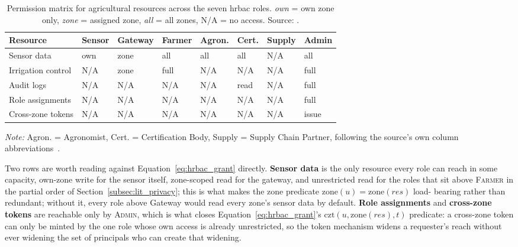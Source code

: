 \documentclass[12pt,a4paper,oneside]{book}
\begin{document}
\begin{table}[htbp]
\centering
\caption{Permission matrix for agricultural resources across the seven
         \gls{hrbac} roles. \emph{own} = own zone only, \emph{zone} =
         assigned zone, \emph{all} = all zones, N/A = no access.
         Source: \cite{beloasone2025hrbac}.}
\label{tab:app-hrbac-matrix}
\footnotesize
\begin{tabularx}{\textwidth}{@{}p{}X X X X X X X@{}}
\toprule
\textbf{Resource} & \textbf{Sensor} & \textbf{Gateway} & \textbf{Farmer} &
  \textbf{Agron.} & \textbf{Cert.} & \textbf{Supply} & \textbf{Admin} \\
\midrule
Sensor data        & own & zone & all  & all & all  & N/A   & all \\
Irrigation control  & N/A & zone & full & N/A & N/A  & N/A   & full \\
Audit logs          & N/A & N/A  & N/A  & N/A & read & N/A   & full \\
Role assignments    & N/A & N/A  & N/A  & N/A & N/A  & N/A   & full \\
Cross-zone tokens   & N/A & N/A  & N/A  & N/A & N/A  & N/A   & issue \\
\bottomrule
\end{tabularx}
{\footnotesize \textit{Note:} Agron. = Agronomist, Cert. = Certification
 Body, Supply = Supply Chain Partner, following the source's own column
 abbreviations~\cite{beloasone2025hrbac}.}
\end{table}

Two rows are worth reading against Equation~\ref{eq:hrbac_grant} directly.
\textbf{Sensor data} is the only resource every role can reach in some
capacity, own-zone write for the sensor itself, zone-scoped read for the
gateway, and unrestricted read for the roles that sit above \textsc{Farmer}
in the partial order of Section~\ref{subsec:lit_privacy}; this is what
makes the zone predicate $\mathrm{zone}(u) = \mathrm{zone}(res)$ load-
bearing rather than redundant; without it, every role above Gateway would
read every zone's sensor data by default. \textbf{Role assignments} and
\textbf{cross-zone tokens} are reachable only by \textsc{Admin}, which is
what closes Equation~\ref{eq:hrbac_grant}'s $\mathrm{czt}(u,\mathrm{zone}
(res),t)$ predicate: a cross-zone token can only be minted by the one role
whose own access is already unrestricted, so the token mechanism widens a
requester's reach without ever widening the set of principals who can
create that widening.
\clearpage{}
\end{document}
